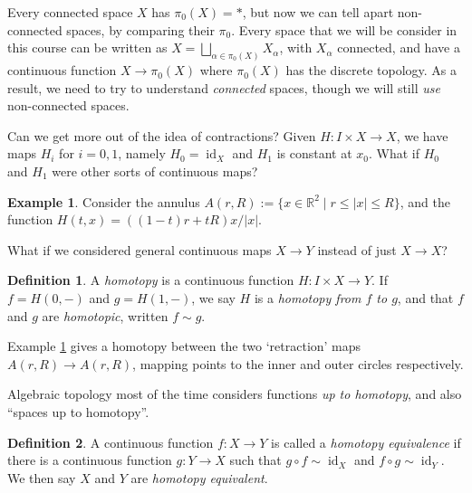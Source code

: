 \documentclass{tufte-handout}
\DeclareMathOperator{\id}{id}
\theoremstyle{definition}
\newtheorem{definition}{Definition}
\newtheorem{example}{Example}
\begin{document}
Every connected space $X$ has $\pi_0(X) = *$, but now we can tell apart non-connected 
spaces, by comparing their $\pi_0$. 
Every space that we will be consider in this 
course can be written as $X = \bigsqcup_{\alpha\in\pi_0(X)} X_\alpha$, with $X_\alpha$ 
connected, and have a continuous function $X\to \pi_0(X)$ where $\pi_0(X)$ has the discrete
topology. 
As a result, we need to try to understand \emph{connected} spaces, though we 
will still \emph{use} non-connected spaces.

Can we get more out of the idea of contractions? Given $H\colon I\times X\to X$, we have 
maps $H_i$ for $i=0,1$, namely $H_0 = \id_X$ and $H_1$ is constant at $x_0$. What if 
$H_0$ and $H_1$ were other sorts of continuous maps? \medskip

\begin{example}\label{eg:annulus}
Consider the annulus $A(r,R) := \{x \in \mathbb{R}^2\mid r\leq |x| \leq R\}$, and the function 
$H(t,x) = ((1-t)r + tR)x/|x|$.
\end{example}

What if we considered general continuous maps $X\to Y$ instead of just $X\to X$?

\begin{definition}
	A \emph{homotopy} is a continuous function $H\colon I \times X\to Y$. 
	If $f = H(0,-)$ and $g = H(1,-)$, we say $H$ is a \emph{homotopy from $f$ to $g$}, and that $f$ and $g$ are \emph{homotopic}, written $f\sim g$.
\end{definition}

Example \ref{eg:annulus} gives a homotopy between the two `retraction' maps $A(r,R) \to 
A(r,R)$, mapping points to the inner and outer circles respectively.

Algebraic topology most of the time considers functions \emph{up to homotopy}, and also 
``spaces up to homotopy''.

\begin{definition}
A continuous function $f\colon X\to Y$ is called a \emph{homotopy equivalence} if there is a continuous function $g\colon Y\to X$ such that $g\circ f\sim \id_X$ and $f\circ g\sim \id_Y$. We then say $X$ and $Y$ are \emph{homotopy equivalent}.
\end{definition}
\end{document}
